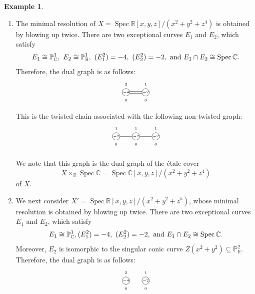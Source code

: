 \documentclass[12pt]{amsart}
\def\Spec{\operatorname{Spec}}
\newcommand{\C}{\mathbb{C}}
\newcommand{\R}{\mathbb{R}}
\newcommand{\PP}{\mathbb{P}}
\theoremstyle{plain}
\theoremstyle{definition}
\newtheorem{eg}[thm]{Example}
\theoremstyle{remark}
\newtheorem{defn and notation}[thm]{Definition and Notation}
\theoremstyle{plain}
\numberwithin{equation}{thm}
\begin{document}
\begin{eg}
\
    \begin{enumerate}[label=\textup{(\arabic*)}]
    \item The minimal resolution of $X= \Spec \R[x,y,z]/(x^2+y^2+z^4)$ is obtained by blowing up twice.
    There are two exceptional curves $E_1$ and $E_2$, which satisfy 
    \[
    E_1 \cong \PP^1_{\C}, \ E_2 \cong \PP^1_{\R},\  (E_1^2)=-4,\ (E_2^2)=-2,\  \textup{and}\  E_1 \cap E_2 \cong \Spec \C.
    \]
    Therefore, the dual graph is as follows:
       \[
\begin{tikzpicture}
\node[draw, shape=circle, inner sep=0.3pt] (E1) at (3,0){\tiny $-4$};
\node[draw, shape=circle, inner sep=0.3pt] (E2) at (4,0){\tiny $-2$};
\draw[shift={(0,0.4)}] (3,0) node{\tiny $2$};
\draw[shift={(0,0.4)}] (4,0) node{\tiny $1$};
\draw[shift={(0,-0.4)}] (3,0) node{\tiny $0$};
\draw[shift={(0,-0.4)}] (4,0) node{\tiny $0$};

\draw (E1.15)--(E2.165);
\draw (E1.-15)--(E2.-165);
\end{tikzpicture}\]   
This is the twisted chain associated with the following non-twisted graph:
\[
\begin{tikzpicture}
\node[draw, shape=circle, inner sep=0.3pt] (E1) at (3,0){\tiny $-2$};
\node[draw, shape=circle, inner sep=0.3pt] (E2) at (4,0){\tiny $-2$};
\node[draw, shape=circle, inner sep=0.3pt] (E3) at (5,0){\tiny $-2$};

\draw[shift={(0,0.4)}] (3,0) node{\tiny $1$};
\draw[shift={(0,0.4)}] (4,0) node{\tiny $1$};
\draw[shift={(0,0.4)}] (5,0) node{\tiny $1$};
\draw[shift={(0,-0.4)}] (3,0) node{\tiny $0$};
\draw[shift={(0,-0.4)}] (4,0) node{\tiny $0$};
\draw[shift={(0,-0.4)}] (5,0) node{\tiny $0$};

\draw (E1)--(E2);
\draw (E2)--(E3);
\end{tikzpicture}\]   

We note that this graph is the dual graph of the \'etale cover
\[
X \times_\R \Spec \C=\Spec \C[x,y,z]/(x^2+y^2+z^4)
\]
of $X$.

\item We next consider $X' = \Spec \R[x,y,z]/(x^2+y^2+z^5)$, whose minimal resolution is obtained by blowing up twice.
    There are two exceptional curves $E_1$ and $E_2$, which satisfy 
    \[
    E_1 \cong \PP^1_{\C},  (E_1^2)=-4,\ (E_2^2)=-2,\  \textup{and}\  E_1 \cap E_2 \cong \Spec \C.
    \]
    Moreover, $E_2$ is isomorphic to the singular conic curve $Z(x^2+y^2) \subseteq \PP^2_{\R}$.
    Therefore, the dual graph is as follows:
       \[
\begin{tikzpicture}
\node[draw, shape=circle, inner sep=0.3pt] (E1) at (3,0){\tiny $-4$};
\node[draw, shape=circle, inner sep=0.3pt] (E2) at (4,0){\tiny $-2$};
\draw[shift={(0,0.4)}] (3,0) node{\tiny $2$};
\draw[shift={(0,0.4)}] (4,0) node{\tiny $1$};
\draw[shift={(0,-0.4)}] (3,0) node{\tiny $0$};
\draw[shift={(0,-0.4)}] (4,0) node{\tiny $0$};


\end{tikzpicture}\]
\end{enumerate}
\end{eg}
\end{document}
